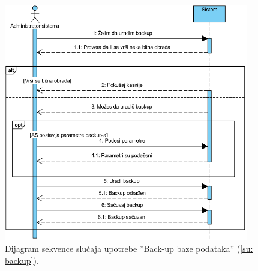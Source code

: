 \newpage

\begin{figure}[H]
	\centering
	\includegraphics[width=0.95\textwidth]{dijagrami/dijagrami-sekvence/backup.png}
	\caption{Dijagram sekvence slu\v caja upotrebe ''Back-up baze podataka'' (\ref{su: backup}).}
\end{figure}